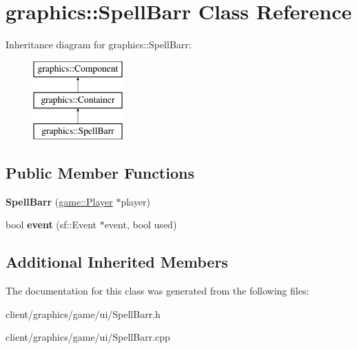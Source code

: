 \hypertarget{classgraphics_1_1_spell_barr}{\section{graphics\-:\-:Spell\-Barr Class Reference}
\label{classgraphics_1_1_spell_barr}
}
Inheritance diagram for graphics\-:\-:Spell\-Barr\-:\begin{figure}[H]
\begin{center}
\leavevmode
\includegraphics[height=3.000000cm]{classgraphics_1_1_spell_barr}
\end{center}
\end{figure}
\subsection*{Public Member Functions}
\begin{DoxyCompactItemize}
\item 
\hypertarget{classgraphics_1_1_spell_barr_a0268ab9c0d9960ed2c93d30b13e12be7}{{\bfseries Spell\-Barr} (\hyperlink{classgame_1_1_player}{game\-::\-Player} $\ast$player)}\label{classgraphics_1_1_spell_barr_a0268ab9c0d9960ed2c93d30b13e12be7}

\item 
\hypertarget{classgraphics_1_1_spell_barr_a02d74012e961ff6ff5211ba0f2cc0952}{bool {\bfseries event} (sf\-::\-Event $\ast$event, bool used)}\label{classgraphics_1_1_spell_barr_a02d74012e961ff6ff5211ba0f2cc0952}

\end{DoxyCompactItemize}
\subsection*{Additional Inherited Members}


The documentation for this class was generated from the following files\-:\begin{DoxyCompactItemize}
\item 
client/graphics/game/ui/Spell\-Barr.\-h\item 
client/graphics/game/ui/Spell\-Barr.\-cpp\end{DoxyCompactItemize}
